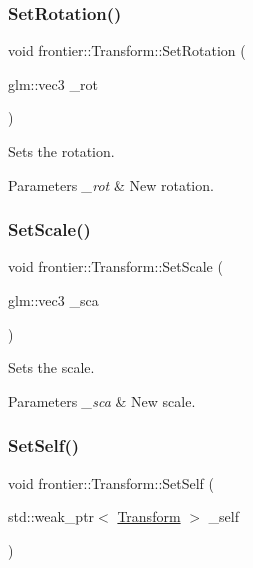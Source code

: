 \subsubsection{\texorpdfstring{Set\+Rotation()}{SetRotation()}}
{\footnotesize\ttfamily void frontier\+::\+Transform\+::\+Set\+Rotation (\begin{DoxyParamCaption}\item[{glm\+::vec3}]{\+\_\+rot }\end{DoxyParamCaption})}



Sets the rotation. 


\begin{DoxyParams}{Parameters}
{\em \+\_\+rot} & New rotation. \\
\hline
\end{DoxyParams}
\mbox{\label{classfrontier_1_1_transform_ab6803171399b1ba2825f3f47f6eaffaa}} 
\subsubsection{\texorpdfstring{Set\+Scale()}{SetScale()}}
{\footnotesize\ttfamily void frontier\+::\+Transform\+::\+Set\+Scale (\begin{DoxyParamCaption}\item[{glm\+::vec3}]{\+\_\+sca }\end{DoxyParamCaption})}



Sets the scale. 


\begin{DoxyParams}{Parameters}
{\em \+\_\+sca} & New scale. \\
\hline
\end{DoxyParams}
\mbox{\label{classfrontier_1_1_transform_a10e72a1e49de0c3c3a36f920612a39ce}} 
\subsubsection{\texorpdfstring{Set\+Self()}{SetSelf()}}
{\footnotesize\ttfamily void frontier\+::\+Transform\+::\+Set\+Self (\begin{DoxyParamCaption}\item[{std\+::weak\+\_\+ptr$<$ \hyperlink{classfrontier_1_1_transform}{Transform} $>$}]{\+\_\+self }\end{DoxyParamCaption})}



